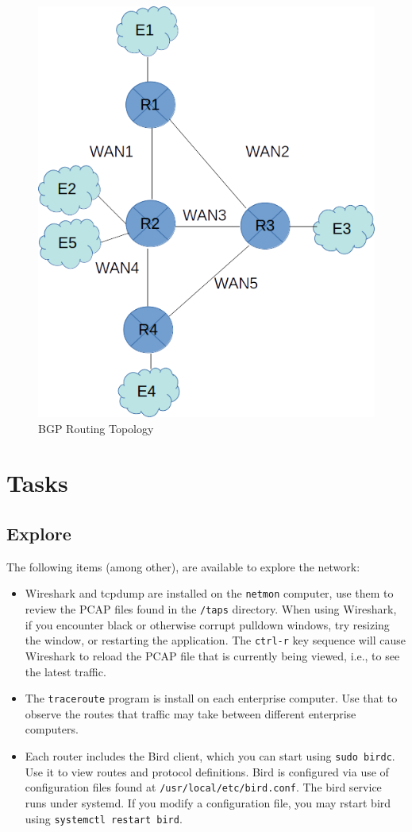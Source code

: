 \begin{figure}[H]
\begin{center}
\includegraphics [width=0.8\linewidth]{topo.png}
\end{center}
\caption{BGP Routing Topology}
\label{fig:topology}
\end{figure}

\section{Tasks}

\subsection{Explore}
The following items (among other), are available to explore the network:
\begin{itemize}
\item Wireshark and tcpdump are installed on the {\tt netmon} computer, use them to review the PCAP files found in
the {\tt /taps} directory.  When using Wireshark, if you encounter black or otherwise corrupt pulldown windows, try resizing the window,
or restarting the application.  The {\tt ctrl-r} key sequence will cause Wireshark to reload the PCAP file that is
currently being viewed, i.e., to see the latest traffic.
\item The {\tt traceroute} program is install on each enterprise computer.  Use that to observe the routes that
traffic may take between different enterprise computers.
\item Each router includes the Bird client, which you can start using {\tt sudo birdc}.  Use it to view routes and
protocol definitions.  Bird is configured via use of configuration files found at {\tt /usr/local/etc/bird.conf}. 
The bird service runs under systemd.  If you modify a configuration file, you may rstart bird using {\tt systemctl restart
bird}.
\end{itemize}

